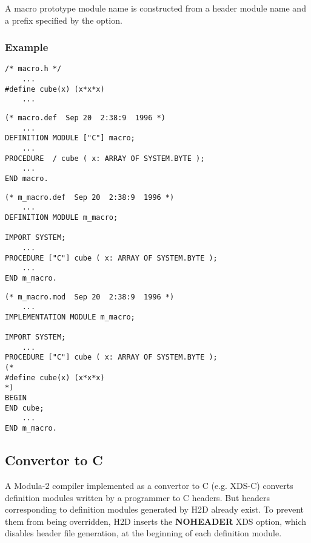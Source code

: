 A macro prototype module name is constructed from a header module name and
a prefix specified by the  option.

\subsubsection*{Example}

{\ifonline\else\small\fi
\begin{verbatim}
/* macro.h */
    ...
#define cube(x) (x*x*x)
    ...
\end{verbatim}

\Sep %

\begin{verbatim}
(* macro.def  Sep 20  2:38:9  1996 *)
    ...
DEFINITION MODULE ["C"] macro;
    ...
PROCEDURE  / cube ( x: ARRAY OF SYSTEM.BYTE );
    ...
END macro.
\end{verbatim}

\Sep %

\begin{verbatim}
(* m_macro.def  Sep 20  2:38:9  1996 *)
    ...
DEFINITION MODULE m_macro;

IMPORT SYSTEM;
    ...
PROCEDURE ["C"] cube ( x: ARRAY OF SYSTEM.BYTE );
    ...
END m_macro.
\end{verbatim}

\Sep %

\begin{verbatim}
(* m_macro.mod  Sep 20  2:38:9  1996 *)
    ...
IMPLEMENTATION MODULE m_macro;

IMPORT SYSTEM;
    ...
PROCEDURE ["C"] cube ( x: ARRAY OF SYSTEM.BYTE );
(*
#define cube(x) (x*x*x)
*)
BEGIN
END cube;
    ...
END m_macro.
\end{verbatim}
} %

\subsection{Convertor to C}
\label{using:fit:c}

A Modula-2 compiler implemented as a convertor to C (e.g. XDS-C)
converts definition modules written by a programmer to C headers.
But headers corresponding to definition modules generated by H2D
already exist. To prevent them from being overridden, H2D inserts the
{\bf NOHEADER} XDS option, which disables header file generation,
at the beginning of each definition module.

